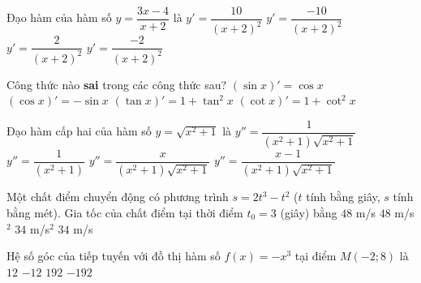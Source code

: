 \begin{ex}%
	Đạo hàm của hàm số $y=\dfrac{3x-4}{x+2}$ là
	\choice
	{\True $y'=\dfrac{10}{(x+2)^2} $}
	{$y'=\dfrac{-10}{(x+2)^2} $}
	{$y'=\dfrac{2}{(x+2)^2} $}
	{$y'=\dfrac{-2}{(x+2)^2} $}
\end{ex}

\begin{ex}%
	Công thức nào \textbf{sai} trong các công thức sau?
	\choice
	{$(\sin x)'=\cos x $}
	{$(\cos x)'=-\sin x $}
	{$(\tan x)'=1+\tan ^2x $}
	{\True $(\cot x)'=1+\cot^2x $}
\end{ex}

\begin{ex}%
	Đạo hàm cấp hai của hàm số $y=\sqrt{x^2+1}$ là
	\choice
	{\True $y''=\dfrac{1}{(x^2+1)\sqrt{x^2+1}} $}
	{$y''=\dfrac{1}{(x^2+1)} $}
	{$y''=\dfrac{x}{(x^2+1)\sqrt{x^2+1}} $}
	{$y''=\dfrac{x-1}{(x^2+1)\sqrt{x^2+1}} $}
\end{ex}

\begin{ex}%
	Một chất điểm chuyển động có phương trình $s=2t^3-t^2$ ($t$ tính bằng giây, $s$ tính bằng mét). Gia tốc của chất điểm tại thời điểm $t_0=3$ (giây) bằng
	\choice
	{$48 $ m/s}
	{$48 $ m/s$^2$}
	{\True $34 $ m/s$^2$}
	{$34$ m/s}
\end{ex}

\begin{ex}%
	Hệ số góc của tiếp tuyến với đồ thị hàm số $f(x)=-x^3$ tại điểm $M(-2;8)$ là
	\choice
	{$12 $}
	{\True $-12 $}
	{$192 $}
	{$-192 $}
\end{ex}

